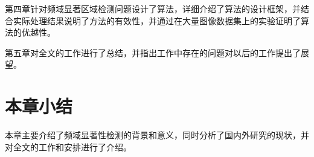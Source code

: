 第四章针对频域显著区域检测问题设计了算法，详细介绍了算法的设计框架，并结合实际处理结果说明了方法的有效性，并通过在大量图像数据集上的实验证明了算法的优越性。

第五章对全文的工作进行了总结，并指出工作中存在的问题对以后的工作提出了展望。

\section{本章小结}
\label{1_4}

本章主要介绍了频域显著性检测的背景和意义，同时分析了国内外研究的现状，并对全文的工作和安排进行了介绍。

